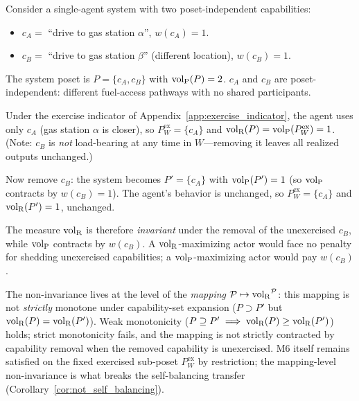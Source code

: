 \begin{example}
\label{ex:volR_removal_invariance}
Consider a single-agent system with two poset-independent
capabilities:
\begin{itemize}
\item $c_A = $ ``drive to gas station $\alpha$'', $w(c_A) = 1$.
\item $c_B = $ ``drive to gas station $\beta$'' (different
  location), $w(c_B) = 1$.
\end{itemize}
The system poset is $P = \{c_A, c_B\}$ with ${\operatorname{vol}_{\mathrm{P}}}(P) = 2$.
$c_A$ and $c_B$ are poset-independent: different
fuel-access pathways with no shared participants.

Under the exercise indicator of
Appendix~\ref{app:exercise_indicator}, the agent uses only $c_A$
(gas station $\alpha$ is closer), so
$P^{\mathrm{ex}}_W = \{c_A\}$ and
${\operatorname{vol}_{\mathrm{R}}}(P) = {\operatorname{vol}_{\mathrm{P}}}(P^{\mathrm{ex}}_W) = 1$.  (Note: $c_B$ is
\emph{not} load-bearing at any time in $W$---removing it leaves
all realized outputs unchanged.)

Now remove $c_B$: the system becomes $P' = \{c_A\}$ with
${\operatorname{vol}_{\mathrm{P}}}(P') = 1$ (so ${\operatorname{vol}_{\mathrm{P}}}$ contracts by $w(c_B) = 1$).  The
agent's behavior is unchanged, so $P^{\mathrm{ex}}_W = \{c_A\}$
and ${\operatorname{vol}_{\mathrm{R}}}(P') = 1$, unchanged.

The measure ${\operatorname{vol}_{\mathrm{R}}}$ is therefore \emph{invariant} under the
removal of the unexercised $c_B$, while ${\operatorname{vol}_{\mathrm{P}}}$ contracts by
$w(c_B)$.  A ${\operatorname{vol}_{\mathrm{R}}}$-maximizing actor would face no penalty for
shedding unexercised capabilities; a ${\operatorname{vol}_{\mathrm{P}}}$-maximizing actor
would pay $w(c_B)$.

The non-invariance lives at the level of the
\emph{mapping} $\mathcal{P} \mapsto {\operatorname{vol}_{\mathrm{R}}}^{\mathcal{P}}$: this
mapping is not \emph{strictly} monotone under capability-set
expansion ($P \supset P'$ but ${\operatorname{vol}_{\mathrm{R}}}(P) = {\operatorname{vol}_{\mathrm{R}}}(P')$).  Weak
monotonicity ($P \supseteq P' \implies {\operatorname{vol}_{\mathrm{R}}}(P) \geq {\operatorname{vol}_{\mathrm{R}}}(P')$)
holds; strict monotonicity fails, and the mapping is not
strictly contracted by capability removal when the removed
capability is unexercised.  M6 itself remains satisfied on the
fixed exercised sub-poset $P^{\mathrm{ex}}_W$ by restriction;
the mapping-level non-invariance is what breaks the
self-balancing transfer
(Corollary~\ref{cor:not_self_balancing}).
\end{example}

